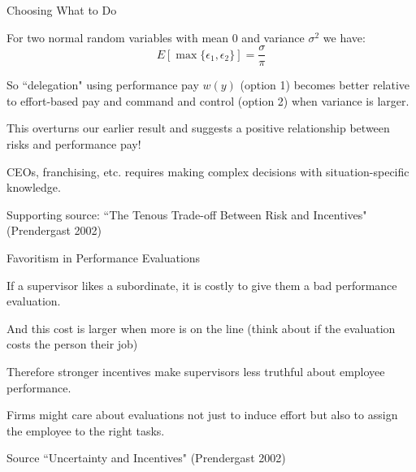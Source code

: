\documentclass[aspectratio=169,usenames,dvipsnames]{beamer}
\newenvironment{wideitemize}{\itemize\addtolength{\itemsep}{10pt}}{\enditemize}
\begin{document}
\begin{frame}{Choosing What to Do}

\begin{wideitemize}
     \item For two normal random variables with mean 0 and variance $\sigma^2$ we have:
    \[E[\max\{\epsilon_1, \epsilon_2\}]=\frac{\sigma}{\pi} \]
    \item So ``delegation" using performance pay $w(y)$ (option 1) becomes better relative to effort-based pay and command and control (option 2) when variance is larger.
    \item This overturns our earlier result and suggests a positive relationship between risks and performance pay!
    \item CEOs, franchising, etc. requires making complex decisions with situation-specific knowledge.
\end{wideitemize}



\small Supporting source: ``The Tenous Trade-off Between Risk and Incentives" (Prendergast 2002)

    
\end{frame}

\begin{frame}{Favoritism in Performance Evaluations}

\begin{wideitemize}
     \item If a supervisor likes a subordinate, it is costly to give them a bad performance evaluation.
     \item And this cost is larger when more is on the line (think about if the evaluation costs the person their job)
     \item Therefore stronger incentives make supervisors less truthful about employee performance.
     \item Firms might care about evaluations not just to induce effort but also to assign the employee to the right tasks.
\end{wideitemize}



\small Source ``Uncertainty and Incentives" (Prendergast 2002)

    
\end{frame}
\end{document}
